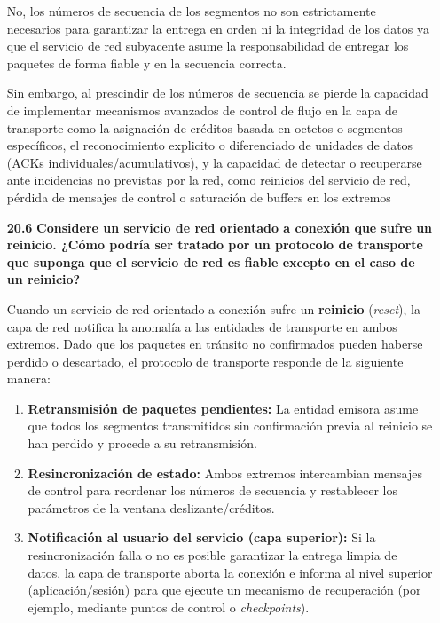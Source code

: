\documentclass[11pt,a4paper]{article}
\begin{document}
\begin{enumerate}
No, los números de secuencia de los segmentos no son estrictamente necesarios para garantizar la entrega en orden ni la integridad de los datos ya que el servicio de red subyacente asume la responsabilidad de entregar los paquetes de forma fiable y en la secuencia correcta.

Sin embargo, al prescindir de los números de secuencia se pierde la capacidad de implementar mecanismos avanzados de control de flujo en la capa de transporte como la asignación de créditos basada en octetos o segmentos específicos, el reconocimiento explicito o diferenciado de unidades de datos (ACKs individuales/acumulativos), y la capacidad de detectar o recuperarse ante incidencias no previstas por la red, como reinicios del servicio de red, pérdida de mensajes de control o saturación de buffers en los extremos

    \item[\textbf{20.6}] \textbf{Considere un servicio de red orientado a conexión que sufre un reinicio. ¿Cómo podría ser tratado por un protocolo de transporte que suponga que el servicio de red es fiable excepto en el caso de un reinicio?}

Cuando un servicio de red orientado a conexión sufre un \textbf{reinicio} (\textit{reset}), la capa de red notifica la anomalía a las entidades de transporte en ambos extremos. Dado que los paquetes en tránsito no confirmados pueden haberse perdido o descartado, el protocolo de transporte responde de la siguiente manera:

\begin{enumerate}
    \item \textbf{Retransmisión de paquetes pendientes:} La entidad emisora asume que todos los segmentos transmitidos sin confirmación previa al reinicio se han perdido y procede a su retransmisión.
    
    \item \textbf{Resincronización de estado:} Ambos extremos intercambian mensajes de control para reordenar los números de secuencia y restablecer los parámetros de la ventana deslizante/créditos.
    
    \item \textbf{Notificación al usuario del servicio (capa superior):} Si la resincronización falla o no es posible garantizar la entrega limpia de datos, la capa de transporte aborta la conexión e informa al nivel superior (aplicación/sesión) para que ejecute un mecanismo de recuperación (por ejemplo, mediante puntos de control o \textit{checkpoints}).
\end{enumerate}
    

\end{enumerate}
\end{document}
